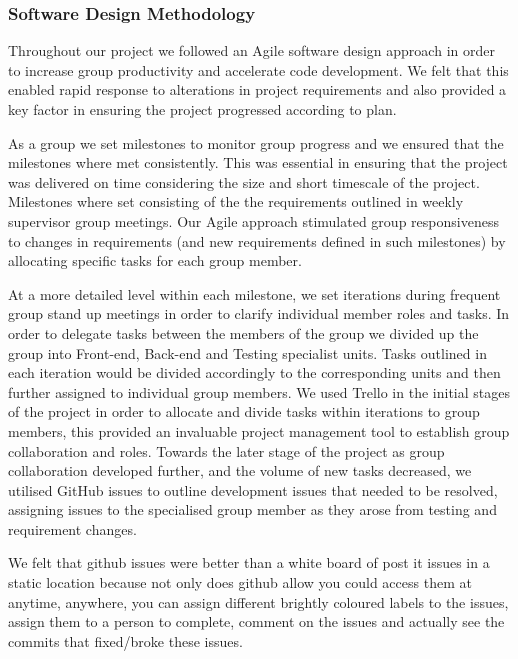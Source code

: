  \subsubsection{Software Design Methodology}
    Throughout our project we followed an Agile software design approach in order to increase group productivity and accelerate code development. We felt that this enabled rapid response to alterations in project requirements and also provided a key factor in ensuring the project progressed according to plan.

    As a group we set milestones to monitor group progress and we ensured that the milestones where met consistently. This was essential in ensuring that the project was delivered on time considering the size and short timescale of the project. Milestones where set consisting of the the requirements outlined in weekly supervisor group meetings. Our Agile approach stimulated group responsiveness to changes in requirements (and new requirements defined in such milestones) by allocating specific tasks for each group member. 

    At a more detailed level within each milestone, we set iterations during frequent group stand up meetings in order to clarify individual member roles and tasks. In order to delegate tasks between the members of the group we divided up the group into Front-end, Back-end and Testing specialist units. Tasks outlined in each iteration would be divided accordingly to the corresponding units and then further assigned to individual group members. We used Trello in the initial stages of the project in order to allocate and divide tasks within iterations to group members, this provided an invaluable project management tool to establish group collaboration and roles. Towards the later stage of the project as group collaboration developed further, and the volume of new tasks decreased, we utilised GitHub issues to outline development issues that needed to be resolved, assigning issues to the specialised group member as they arose from testing and requirement changes.

    We felt that github issues were better than a white board of post it issues in a static location because not only does github allow you could access them at anytime, anywhere, you can assign different brightly coloured labels to the issues, assign them to a person to complete, comment on the issues and actually see the commits that fixed/broke these issues.


